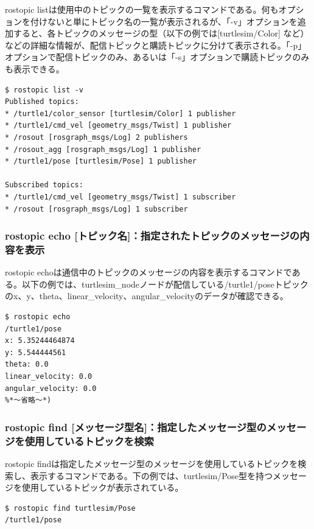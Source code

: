 rostopic listは使用中のトピックの一覧を表示するコマンドである。何もオプションを付けないと単にトピック名の一覧が表示されるが、「-v」オプションを追加すると、各トピックのメッセージの型（以下の例では[turtlesim/Color] など）などの詳細な情報が、配信トピックと購読トピックに分けて表示される。「-p」オプションで配信トピックのみ、あるいは「-s」オプションで購読トピックのみも表示できる。

\begin{lstlisting}[language=ROS]
$ rostopic list -v
Published topics:
* /turtle1/color_sensor [turtlesim/Color] 1 publisher
* /turtle1/cmd_vel [geometry_msgs/Twist] 1 publisher
* /rosout [rosgraph_msgs/Log] 2 publishers
* /rosout_agg [rosgraph_msgs/Log] 1 publisher
* /turtle1/pose [turtlesim/Pose] 1 publisher

Subscribed topics:
* /turtle1/cmd_vel [geometry_msgs/Twist] 1 subscriber
* /rosout [rosgraph_msgs/Log] 1 subscriber
\end{lstlisting}

\subsubsection{rostopic echo [トピック名]：指定されたトピックのメッセージの内容を表示}

rostopic echoは通信中のトピックのメッセージの内容を表示するコマンドである。以下の例では、turtlesim\_nodeノードが配信している/turtle1/poseトピックのx、y、theta、linear\_velocity、angular\_velocityのデータが確認できる。

\begin{lstlisting}[language=ROS]
$ rostopic echo
/turtle1/pose
x: 5.35244464874
y: 5.544444561
theta: 0.0
linear_velocity: 0.0
angular_velocity: 0.0
%*〜省略〜*)
\end{lstlisting}

\subsubsection{rostopic find [メッセージ型名]：指定したメッセージ型のメッセージを使用しているトピックを検索}

rostopic findは指定したメッセージ型のメッセージを使用しているトピックを検索し、表示するコマンドである。下の例では、turtlesim/Pose型を持つメッセージを使用しているトピックが表示されている。

\begin{lstlisting}[language=ROS]
$ rostopic find turtlesim/Pose
/turtle1/pose
\end{lstlisting}

